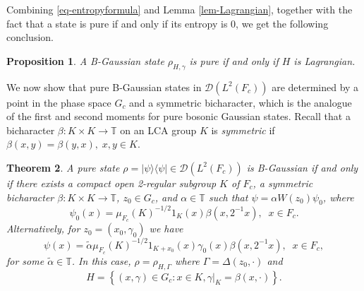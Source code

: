 \documentclass[12pt,reqno]{amsart}
\newtheorem{thm}{Theorem}
\newtheorem{prop}[thm]{Proposition}
\theoremstyle{definition}
\theoremstyle{definition}
\theoremstyle{definition}
\numberwithin{thm}{section}
\numberwithin{equation}{section}
\newcommand{\set}[1]{\left\{#1\right\}}
\newcommand{\la}{\langle}
\newcommand{\ra}{\rangle}
\newcommand{\D}{\mathcal{D}}
\newcommand{\tor}{\mathbb{T}}
\newcommand{\mc}[1]{\mathcal #1}
\begin{document}
Combining \eqref{eq-entropyformula} and Lemma \ref{lem-Lagrangian}, together with the fact that a state is pure if and only if its entropy is 0, we get the following conclusion.

\begin{prop} \label{prop-finGauss-pure1} A B-Gaussian state $\rho_{H,\gamma}$ is pure if and only if $H$ is Lagrangian.
\end{prop}


We now show that pure B-Gaussian states in $\D(L^2(F_c))$ are determined by a point in the phase space $G_c$ and a symmetric bicharacter, which is the analogue of the first and second moments for pure bosonic Gaussian states. Recall that a bicharacter $\beta:K\times K\to \tor$ on an LCA group $K$ is {\em symmetric} if $\beta(x,y)=\beta(y,x),\; x,y\in K$.


\begin{thm} \label{thm-finGauss-pure2}
A pure state $\rho=|\psi\ra\la\psi|\in \mc{D}(L^2(F_c))$ is B-Gaussian if and only if there exists a compact open 2-regular subgroup $K$ of $F_c$, a symmetric bicharacter $\beta:K\times K\to \tor$, $z_0\in G_c$, and $\alpha\in \tor$ such that $\psi=\alpha W(z_0)\psi_0$, where
\begin{equation} \label{eq-pure-Gaussian}
    \psi_0(x)=\mu_{F_c}(K)^{-1/2} 1_{K}(x)\beta(x,2^{-1}x),\;\; x\in F_c.
\end{equation}
Alternatively, for $z_0 = (x_0,\gamma_0)$ we have
    $$\psi(x)=\tilde{\alpha}\mu_{F_c}(K)^{-1/2} 1_{K+x_0}(x)\gamma_0(x)\beta(x,2^{-1}x),\;\; x\in F_c,$$
for some $\tilde{\alpha}\in \tor$. In this case, $\rho=\rho_{H,\Gamma}$ where $\Gamma=\Delta(z_0,\cdot)$ and
\begin{equation} \label{eq-Lagrangian}
    H=\set{(x,\gamma)\in G_c:x\in K, \gamma|_K=\beta(x,\cdot)}.
\end{equation}
\end{thm}
\end{document}
